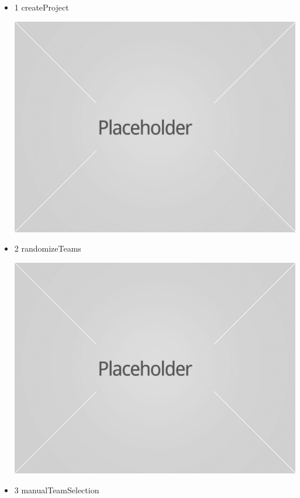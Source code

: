 \documentclass[hidelinks, 12pt, oneside]{article}
\begin{document}
\begin{itemize}
\item 1 createProject
\par
\includegraphics[width=13cm]{image.jpg}
    \rule{0\linewidth}{0.15\linewidth}\par
\item 2 randomizeTeams
\par
\includegraphics[width=13cm]{image.jpg}
    \rule{0\linewidth}{0.15\linewidth}\par
\item 3 manualTeamSelection
\par

\end{itemize}
\end{document}
